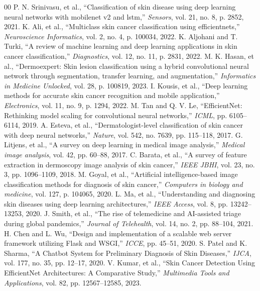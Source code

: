 \documentclass[conference]{IEEEtran}
\begin{document}
\begin{thebibliography}{00}
 P. N. Srinivasu, et al., ``Classification of skin disease using deep learning neural networks with mobilenet v2 and lstm,'' \emph{Sensors}, vol. 21, no. 8, p. 2852, 2021.
 K. Ali, et al., ``Multiclass skin cancer classification using efficientnets,'' \emph{Neuroscience Informatics}, vol. 2, no. 4, p. 100034, 2022.
 K. Aljohani and T. Turki, ``A review of machine learning and deep learning applications in skin cancer classification,'' \emph{Diagnostics}, vol. 12, no. 11, p. 2831, 2022.
 M. K. Hasan, et al., ``Dermoexpert: Skin lesion classification using a hybrid convolutional neural network through segmentation, transfer learning, and augmentation,'' \emph{Informatics in Medicine Unlocked}, vol. 28, p. 100819, 2023.
 I. Kousis, et al., ``Deep learning methods for accurate skin cancer recognition and mobile application,'' \emph{Electronics}, vol. 11, no. 9, p. 1294, 2022.
 M. Tan and Q. V. Le, ``EfficientNet: Rethinking model scaling for convolutional neural networks,'' \emph{ICML}, pp. 6105–6114, 2019.
 A. Esteva, et al., ``Dermatologist-level classification of skin cancer with deep neural networks,'' \emph{Nature}, vol. 542, no. 7639, pp. 115–118, 2017.
 G. Litjens, et al., ``A survey on deep learning in medical image analysis,'' \emph{Medical image analysis}, vol. 42, pp. 60–88, 2017.
 C. Barata, et al., ``A survey of feature extraction in dermoscopy image analysis of skin cancer,'' \emph{IEEE JBHI}, vol. 23, no. 3, pp. 1096–1109, 2018.
 M. Goyal, et al., ``Artificial intelligence-based image classification methods for diagnosis of skin cancer,'' \emph{Computers in biology and medicine}, vol. 127, p. 104065, 2020.
 L. Ma, et al., ``Understanding and diagnosing skin diseases using deep learning architectures,'' \emph{IEEE Access}, vol. 8, pp. 13242–13253, 2020.
 J. Smith, et al., ``The rise of telemedicine and AI-assisted triage during global pandemics,'' \emph{Journal of Telehealth}, vol. 14, no. 2, pp. 88–104, 2021.
 H. Chen and L. Wu, ``Design and implementation of a scalable web server framework utilizing Flask and WSGI,'' \emph{ICCE}, pp. 45–51, 2020.
 S. Patel and K. Sharma, ``A Chatbot System for Preliminary Diagnosis of Skin Diseases,'' \emph{IJCA}, vol. 177, no. 35, pp. 12–17, 2020.
 V. Kumar, et al., ``Skin Cancer Detection Using EfficientNet Architectures: A Comparative Study,'' \emph{Multimedia Tools and Applications}, vol. 82, pp. 12567–12585, 2023.
\end{thebibliography}
\end{document}
